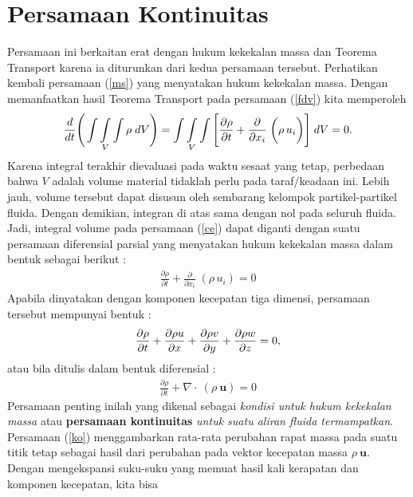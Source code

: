 \documentclass[12pt,a4paper]{report}
\begin{document}
\section{Persamaan Kontinuitas}

\label{kontinuitas}

Persamaan ini berkaitan erat dengan hukum kekekalan massa dan Teorema
Transport karena ia diturunkan dari kedua persamaan tersebut. Perhatikan
kembali persamaan (\ref{ms}) yang menyatakan hukum kekekalan massa. Dengan
memanfaatkan hasil Teorema Transport pada persamaan (\ref{fdv}) kita
memperoleh
\begin{eqnarray}
\frac{d}{dt}\Bigg(\mathop {\int\int\int}_{V} \rho \; dV\Bigg) = %
\mathop{\int\int\int}_{V}\Bigg[\frac{\partial \rho}{\partial t }+\frac{%
\partial}{\partial x_{i}}\;\bigg(\rho\, u_{i}\bigg)\Bigg]\;dV = 0.
\label{ce}
\end{eqnarray}
Karena integral terakhir dievaluasi pada waktu sesaat yang tetap, perbedaan
bahwa $V$ adalah volume material tidaklah perlu pada taraf/keadaan ini.
Lebih jauh, volume tersebut dapat disusun oleh sembarang kelompok
partikel-partikel fluida. Dengan demikian, integran di atas sama dengan nol
pada seluruh fluida. Jadi, integral volume pada persamaan (\ref{ce}) dapat
diganti dengan suatu persamaan diferensial parsial yang menyatakan hukum
kekekalan massa dalam bentuk sebagai berikut :
\begin{eqnarray}
\frac{\partial \rho}{\partial t}+\frac{\partial}{\partial x_{i}}%
\;(\rho\,u_{i})=0
\end{eqnarray}
Apabila dinyatakan dengan komponen kecepatan tiga dimensi, persamaan
tersebut mempunyai bentuk :
\begin{eqnarray}
\frac{\partial \rho}{\partial t}+\frac{\partial \rho u}{\partial x}+\frac{%
\partial \rho v}{\partial y}+\frac{\partial \rho w }{\partial z}=0,
\label{ko}
\end{eqnarray}
atau bila ditulis dalam bentuk diferensial :
\begin{eqnarray}
\frac{\partial\rho}{\partial t}+\nabla\cdot\ (\rho\:\mathbf{u})=0
\end{eqnarray}
Persamaan penting inilah yang dikenal sebagai \textit{kondisi untuk hukum
kekekalan massa} atau \textbf{persamaan kontinuitas} \textit{untuk suatu
aliran fluida termampatkan}. Persamaan (\ref{ko}) menggambarkan rata-rata
perubahan rapat massa pada suatu titik tetap sebagai hasil dari perubahan
pada vektor kecepatan massa $\rho\:\mathbf{u}$. Dengan mengekspansi
suku-suku yang memuat hasil kali kerapatan dan komponen kecepatan, kita bisa
\end{document}
